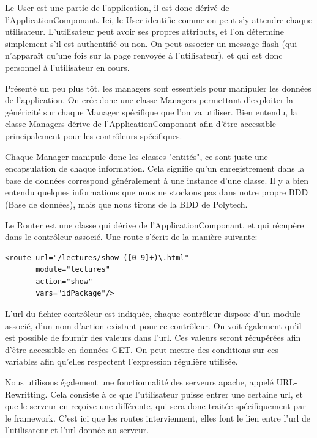 Le User est une partie de l'application, il est donc dérivé de l'ApplicationComponant. Ici, le User identifie comme on peut
s'y attendre chaque utilisateur. L'utilisateur peut avoir ses propres attributs, et l'on détermine simplement s'il est authentifié
ou non. On peut associer un message flash (qui n'apparaît qu'une fois sur la page renvoyée à l'utilisateur), et qui est donc personnel
à l'utilisateur en cours.

Présenté un peu plus tôt, les managers sont essentiels pour manipuler les données de l'application. On crée donc une classe
Managers permettant d'exploiter la généricité sur chaque Manager spécifique que l'on va utiliser. Bien entendu, la classe
Managers dérive de l'ApplicationComponant afin d'être accessible principalement pour les contrôleurs spécifiques.

Chaque Manager manipule donc les classes "entités", ce sont juste une encapsulation de chaque information. Cela signifie
qu'un enregistrement dans la base de données correspond généralement à une instance d'une classe. Il y a bien entendu quelques
informations que nous ne stockons pas dans notre propre BDD (Base de données), mais que nous tirons de la BDD de Polytech.

Le Router est une classe qui dérive de l'ApplicationComponant, et qui récupère dans le contrôleur associé.
Une route s'écrit de la manière suivante:

    \lstset{language=XML}
    \begin{lstlisting} 
<route url="/lectures/show-([0-9]+)\.html"
       module="lectures"
       action="show"
       vars="idPackage"/>
    \end{lstlisting}

L'url du fichier contrôleur est indiquée, chaque contrôleur dispose d'un module associé, d'un nom d'action existant pour ce
contrôleur. On voit également qu'il est possible de fournir des valeurs dans l'url. Ces valeurs seront récupérées afin
d'être accessible en données GET. On peut mettre des conditions sur ces variables afin qu'elles respectent l'expression régulière
utilisée.

Nous utilisons également une fonctionnalité des serveurs apache, appelé URL-Rewritting. Cela consiste à ce que l'utilisateur
puisse entrer une certaine url, et que le serveur en reçoive une différente, qui sera donc traitée spécifiquement par le framework.
C'est ici que les routes interviennent, elles font le lien entre l'url de l'utilisateur et l'url donnée au serveur.

